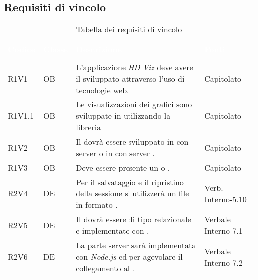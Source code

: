 \subsection{Requisiti di vincolo}
{
\setlength\arrayrulewidth{1pt}
\begin{longtable}{C{2cm} | C{1.5cm} | C{9cm} | C{3.3cm}}
		\textcolor{white}{\textbf{Codice}} & 
		\textcolor{white}{\textbf{Classe}} & 
		\textcolor{white}{\textbf{Descrizione}} & 
		\textcolor{white}{\textbf{Fonti}} \\
		\endfirsthead
	    \\
	    \endfoot
	    \caption{Tabella dei requisiti di vincolo}
	    \endlastfoot

R1V1 & OB & L'applicazione \textit{HD Viz} deve avere il  sviluppato attraverso l'uso di tecnologie web. & Capitolato \\
R1V1.1 & OB & Le visualizzazioni dei grafici sono sviluppate in  utilizzando la libreria  & Capitolato\\
R1V2 & OB & Il  dovrà essere sviluppato in  con server  o in  con server . & Capitolato \\
R1V3 & OB & Deve essere presente un   o . & Capitolato\\
R2V4 & DE & Per il salvataggio e il ripristino della sessione si utilizzerà un file in formato . & Verb. Interno-5.10\\
R2V5 & DE & Il  dovrà essere di tipo relazionale e implementato con \textit{}. & Verbale Interno-7.1\\
R2V6 & DE & La parte server sarà implementata con \textit{Node.js} ed \textit{} per agevolare il collegamento al . & Verbale Interno-7.2 \\


\end{longtable}}
